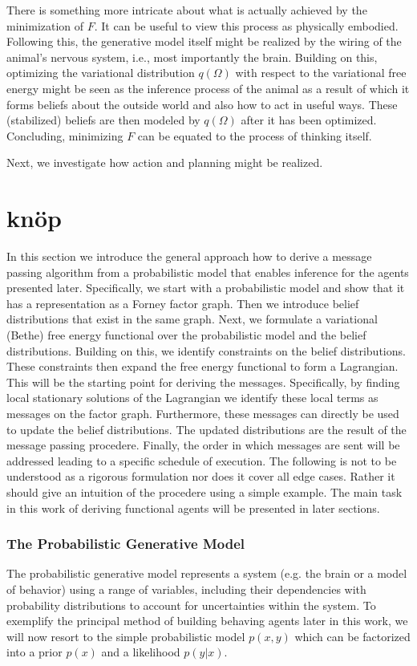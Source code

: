 There is something more intricate about what is actually achieved by the minimization of \(F\). It can be useful to view this process as physically embodied. Following this, the generative model itself might be realized by the wiring of the animal's nervous system, i.e., most importantly the brain. Building on this, optimizing the variational distribution \(q(\Omega)\) with respect to the variational free energy might be seen as the inference process of the animal as a result of which it forms beliefs about the outside world and also how to act in useful ways. These (stabilized) beliefs are then modeled by \(q(\Omega)\) after it has been optimized. Concluding, minimizing \(F\) can be equated to the process of thinking itself.

Next, we investigate how action and planning might be realized.

\chapter{knöp}

In this section we introduce the general approach how to derive a message passing algorithm from a probabilistic model that enables inference for the agents presented later. Specifically, we start with a probabilistic model and show that it has a representation as a Forney factor graph. Then we introduce belief distributions that exist in the same graph. Next, we formulate a variational (Bethe) free energy functional over the probabilistic model and the belief distributions. Building on this, we identify constraints on the belief distributions. These constraints then expand the free energy functional to form a Lagrangian. This will be the starting point for deriving the messages. Specifically, by finding local stationary solutions of the Lagrangian we identify these local terms as messages on the factor graph. Furthermore, these messages can directly be used to update the belief distributions. The updated distributions are the result of the message passing procedere. Finally, the order in which messages are sent will be addressed leading to a specific schedule of execution. The following is not to be understood as a rigorous formulation nor does it cover all edge cases. Rather it should give an intuition of the procedere using a simple example. The main task in this work of deriving functional agents will be presented in later sections.

\subsection{The Probabilistic Generative Model}
The probabilistic generative model represents a system (e.g. the brain or a model of behavior) using a range of variables, including their dependencies with probability distributions to account for uncertainties within the system.
To exemplify the principal method of building behaving agents later in this work, we will now resort to the simple probabilistic model \(p(x,y)\) which can be factorized into a prior \(p(x)\) and a likelihood \(p(y|x)\).

